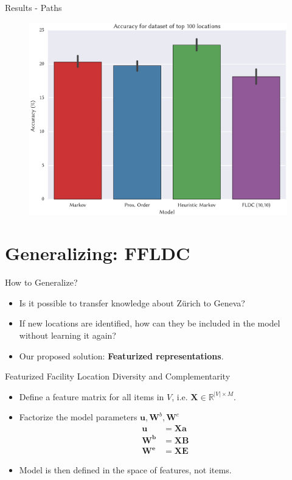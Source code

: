 \documentclass{beamer}
\begin{document}
\begin{frame}{Results - Paths}
  \begin{figure}
    \centering
    \includegraphics[width=.85\textwidth]{all_models_100_presentation_b}
  \end{figure}
\end{frame}

\section{Generalizing: FFLDC}

\begin{frame}{How to Generalize?}
  \begin{itemize}
    \item Is it possible to transfer knowledge about Zürich to Geneva?
    \item If new locations are identified, how can they be included in the model without learning it again?
    \item Our proposed solution: \textbf{Featurized representations}.
  \end{itemize}
\end{frame}

\begin{frame}{Featurized Facility Location Diversity and Complementarity}
  \begin{itemize}
    \item Define a feature matrix for all items in $V$, i.e. $\mathbf{X} \in \mathbb{R}^{|V| \times M}$.
    \item Factorize the model parameters $\mathbf{u}, \mathbf{W}^{b}, \mathbf{W}^{e}$
      \begin{align*}
        \mathbf{u} &= \mathbf{X}\mathbf{a} \\
        \mathbf{W^{b}} &= \mathbf{X}\mathbf{B} \\
        \mathbf{W^{e}} &= \mathbf{X}\mathbf{E}
      \end{align*}
    \item Model is then defined in the space of features, not items.
  \end{itemize}
\end{frame}
\end{document}
